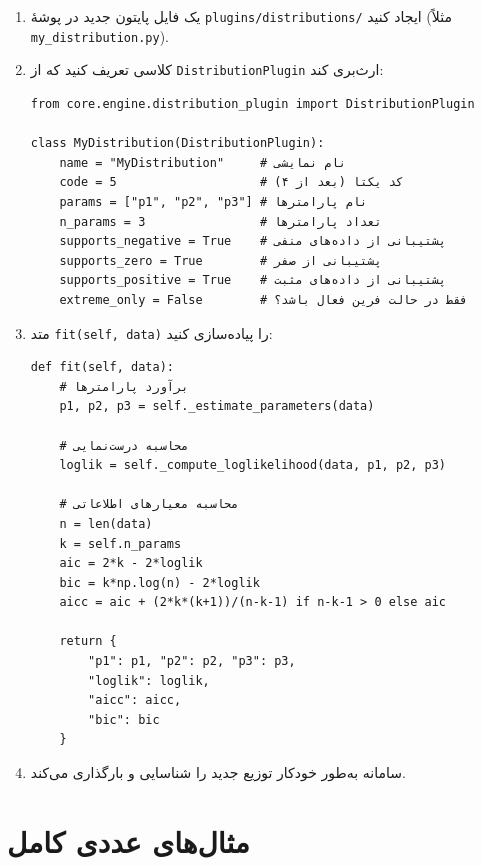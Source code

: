 \documentclass[a4paper,12pt]{article}
\begin{document}
\begin{enumerate}
\item یک فایل پایتون جدید در پوشهٔ \texttt{plugins/distributions/} ایجاد کنید (مثلاً \texttt{my\_distribution.py}).

\item کلاسی تعریف کنید که از \texttt{DistributionPlugin} ارث‌بری کند:

\begin{verbatim}
from core.engine.distribution_plugin import DistributionPlugin

class MyDistribution(DistributionPlugin):
    name = "MyDistribution"     # نام نمایشی
    code = 5                    # کد یکتا (بعد از ۴)
    params = ["p1", "p2", "p3"] # نام پارامترها
    n_params = 3                # تعداد پارامترها
    supports_negative = True    # پشتیبانی از داده‌های منفی
    supports_zero = True        # پشتیبانی از صفر
    supports_positive = True    # پشتیبانی از داده‌های مثبت
    extreme_only = False        # فقط در حالت فرین فعال باشد؟
\end{verbatim}

\item متد \texttt{fit(self, data)} را پیاده‌سازی کنید:

\begin{verbatim}
def fit(self, data):
    # برآورد پارامترها
    p1, p2, p3 = self._estimate_parameters(data)
    
    # محاسبه درست‌نمایی
    loglik = self._compute_loglikelihood(data, p1, p2, p3)
    
    # محاسبه معیارهای اطلاعاتی
    n = len(data)
    k = self.n_params
    aic = 2*k - 2*loglik
    bic = k*np.log(n) - 2*loglik
    aicc = aic + (2*k*(k+1))/(n-k-1) if n-k-1 > 0 else aic
    
    return {
        "p1": p1, "p2": p2, "p3": p3,
        "loglik": loglik,
        "aicc": aicc,
        "bic": bic
    }
\end{verbatim}

\item سامانه به‌طور خودکار توزیع جدید را شناسایی و بارگذاری می‌کند.
\end{enumerate}

\section{مثال‌های عددی کامل}
\end{document}
